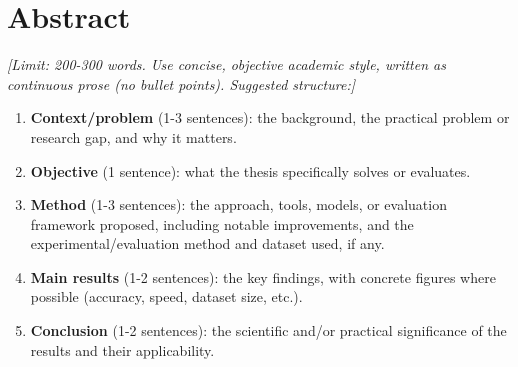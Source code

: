 \chapter*{Abstract}
\label{summary}

\textit{[Limit: 200-300 words. Use concise, objective academic style,
written as continuous prose (no bullet points). Suggested structure:]}

\begin{enumerate}
    \item \textbf{Context/problem} (1-3 sentences): the background, the
    practical problem or research gap, and why it matters.
    \item \textbf{Objective} (1 sentence): what the thesis specifically
    solves or evaluates.
    \item \textbf{Method} (1-3 sentences): the approach, tools, models, or
    evaluation framework proposed, including notable improvements, and the
    experimental/evaluation method and dataset used, if any.
    \item \textbf{Main results} (1-2 sentences): the key findings, with
    concrete figures where possible (accuracy, speed, dataset size, etc.).
    \item \textbf{Conclusion} (1-2 sentences): the scientific and/or
    practical significance of the results and their applicability.
\end{enumerate}

